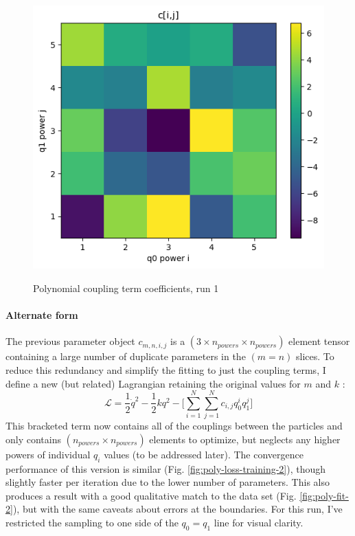 \documentclass[]{article}
\begin{document}
\begin{figure}[H]
	\caption{Polynomial coupling term coefficients, run 1}
	\centering
	\includegraphics[scale=0.60]{poly-coupling-parameters-1.png}
	\label{fig:poly-coupling-parameters-1}
\end{figure}

\paragraph{Alternate form}
The previous parameter object $c_{m,n,i,j}$ is a $(3\times n_{powers} \times n_{powers})$ element tensor containing a large number of duplicate parameters in the $(m=n)$ slices. To reduce this redundancy and simplify the fitting to just the coupling terms, I define a new (but related) Lagrangian retaining the original values for $m$ and $k$ :
\begin{equation}
	\mathcal{L} = \frac{1}{2} \dot{q}^2 - \frac{1}{2}k q^2 - \Bigg[\sum_{i=1}^{N} \sum_{j=1}^{N} c_{i,j} q_0^i q_1^j\Bigg]
\end{equation}
This bracketed term now contains all of the couplings between the particles and only contains $(n_{powers}\times n_{powers})$ elements to optimize, but neglects any higher powers of individual $q_i$ values (to be addressed later). The convergence performance of this version is similar (Fig. \ref{fig:poly-loss-training-2}), though slightly faster per iteration due to the lower number of parameters. This also produces a result with a good qualitative match to the data set (Fig. \ref{fig:poly-fit-2}), but with the same caveats about errors at the boundaries. For this run, I've restricted the sampling to one side of the $q_0=q_1$ line for visual clarity.
\end{document}
